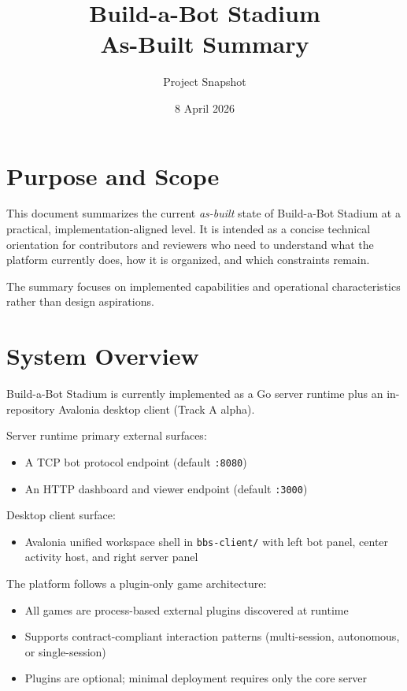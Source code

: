 \documentclass[11pt]{article}
\title{Build-a-Bot Stadium\\As-Built Summary}
\author{Project Snapshot}
\date{8 April 2026}
\begin{document}
\maketitle

\section{Purpose and Scope}
This document summarizes the current \emph{as-built} state of Build-a-Bot Stadium at a practical, implementation-aligned level. It is intended as a concise technical orientation for contributors and reviewers who need to understand what the platform currently does, how it is organized, and which constraints remain.

The summary focuses on implemented capabilities and operational characteristics rather than design aspirations.

\section{System Overview}
Build-a-Bot Stadium is currently implemented as a Go server runtime plus an in-repository Avalonia desktop client (Track A alpha).

Server runtime primary external surfaces:
\begin{itemize}[leftmargin=*]
  \item A TCP bot protocol endpoint (default \texttt{:8080})
  \item An HTTP dashboard and viewer endpoint (default \texttt{:3000})
\end{itemize}

Desktop client surface:
\begin{itemize}[leftmargin=*]
  \item Avalonia unified workspace shell in \texttt{bbs-client/} with left bot panel, center activity host, and right server panel
\end{itemize}

The platform follows a plugin-only game architecture:
\begin{itemize}[leftmargin=*]
  \item All games are process-based external plugins discovered at runtime
  \item Supports contract-compliant interaction patterns (multi-session, autonomous, or single-session)
  \item Plugins are optional; minimal deployment requires only the core server
\end{itemize}
\end{document}
